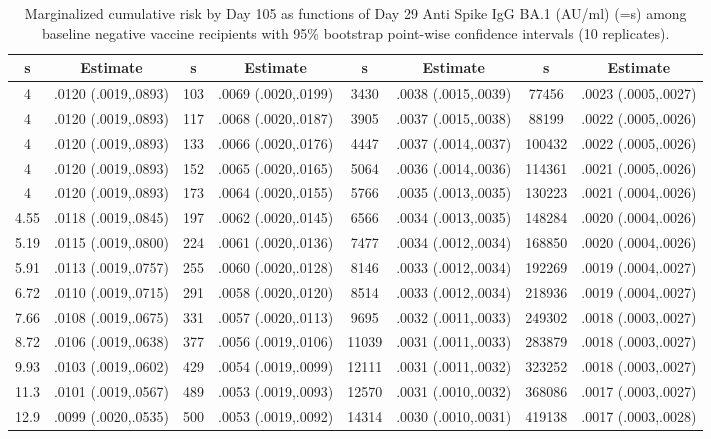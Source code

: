 \begin{longtable}{cccccccc}
\caption{Marginalized cumulative risk by Day 105 as functions of Day 29 Anti Spike IgG BA.1 (AU/ml) (=s) among baseline negative vaccine recipients with 95\% bootstrap point-wise confidence intervals (10 replicates).} \\ 
   \hline  s& Estimate& s& Estimate& s& Estimate& s& Estimate\\ 
\hline
4 & .0120 (.0019,.0893) & 103 & .0069 (.0020,.0199) & 3430 & .0038 (.0015,.0039) & 77456 & .0023 (.0005,.0027) \\ 
  4 & .0120 (.0019,.0893) & 117 & .0068 (.0020,.0187) & 3905 & .0037 (.0015,.0038) & 88199 & .0022 (.0005,.0026) \\ 
  4 & .0120 (.0019,.0893) & 133 & .0066 (.0020,.0176) & 4447 & .0037 (.0014,.0037) & 100432 & .0022 (.0005,.0026) \\ 
  4 & .0120 (.0019,.0893) & 152 & .0065 (.0020,.0165) & 5064 & .0036 (.0014,.0036) & 114361 & .0021 (.0005,.0026) \\ 
  4 & .0120 (.0019,.0893) & 173 & .0064 (.0020,.0155) & 5766 & .0035 (.0013,.0035) & 130223 & .0021 (.0004,.0026) \\ 
  4.55 & .0118 (.0019,.0845) & 197 & .0062 (.0020,.0145) & 6566 & .0034 (.0013,.0035) & 148284 & .0020 (.0004,.0026) \\ 
  5.19 & .0115 (.0019,.0800) & 224 & .0061 (.0020,.0136) & 7477 & .0034 (.0012,.0034) & 168850 & .0020 (.0004,.0026) \\ 
  5.91 & .0113 (.0019,.0757) & 255 & .0060 (.0020,.0128) & 8146 & .0033 (.0012,.0034) & 192269 & .0019 (.0004,.0027) \\ 
  6.72 & .0110 (.0019,.0715) & 291 & .0058 (.0020,.0120) & 8514 & .0033 (.0012,.0034) & 218936 & .0019 (.0004,.0027) \\ 
  7.66 & .0108 (.0019,.0675) & 331 & .0057 (.0020,.0113) & 9695 & .0032 (.0011,.0033) & 249302 & .0018 (.0003,.0027) \\ 
  8.72 & .0106 (.0019,.0638) & 377 & .0056 (.0019,.0106) & 11039 & .0031 (.0011,.0033) & 283879 & .0018 (.0003,.0027) \\ 
  9.93 & .0103 (.0019,.0602) & 429 & .0054 (.0019,.0099) & 12111 & .0031 (.0011,.0032) & 323252 & .0018 (.0003,.0027) \\ 
  11.3 & .0101 (.0019,.0567) & 489 & .0053 (.0019,.0093) & 12570 & .0031 (.0010,.0032) & 368086 & .0017 (.0003,.0027) \\ 
  12.9 & .0099 (.0020,.0535) & 500 & .0053 (.0019,.0092) & 14314 & .0030 (.0010,.0031) & 419138 & .0017 (.0003,.0028) \\ 

\end{longtable}
